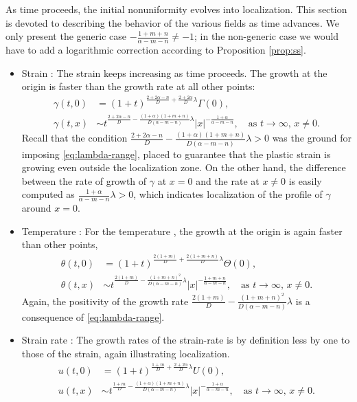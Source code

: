 \documentclass[11pt]{article}
\theoremstyle{remark}
\begin{document}
As time proceeds, the initial nonuniformity evolves into localization. This section is devoted to describing the behavior
of the various fields as time advances. We only present the generic case $-\frac{1+m+n}{\alpha-m-n}\ne-1$;
in the non-generic case we would have to add a logarithmic correction according to Proposition \ref{prop:ss}.
\begin{itemize}
 \item Strain : The strain keeps increasing as time proceeds. The growth at the origin is faster than the growth rate at  all other points:
\begin{align*}
 \gamma(t,0) &= (1+t)^{\frac{2+2\alpha-n}{D} + \frac{2+2\alpha}{D}\lambda}\Gamma(0),
 \\
 \gamma(t,x) &\sim t^{\frac{2+2\alpha-n}{D} - \frac{(1+\alpha)(1+m+n)}{D(\alpha-m-n)}\lambda}|x|^{-\frac{1+\alpha}{\alpha-m-n}}, \quad \text{as $t \rightarrow \infty$, $x\ne0$.}
\end{align*}
Recall that the condition  $\frac{2+2\alpha-n}{D} - \frac{(1+\alpha)(1+m+n)}{D(\alpha-m-n)}\lambda > 0$ was the ground for imposing \eqref{eq:lambda-range},
placed to guarantee that the plastic strain is growing even outside the localization zone. On the other hand, the difference between the rate of growth of $\gamma$ at $x=0$
and the rate at $x \ne 0$ is easily computed as $\frac{1+\alpha}{\alpha - m -n} \lambda > 0$, which indicates localization of the profile of $\gamma$ around $x=0$.
\item Temperature : For the  temperature , the growth at the origin is again faster than other points,
\begin{align*}
 \theta(t,0) &= (1+t)^{\frac{2(1+m)}{D} + \frac{2(1+m+n)}{D}\lambda}\Theta(0),
 \\
 \theta(t,x) &\sim t^{\frac{2(1+m)}{D} - \frac{(1+m+n)^2}{D(\alpha-m-n)}\lambda}|x|^{-\frac{1+m+n}{\alpha-m-n}}, \quad \text{as $t \rightarrow \infty$, $x\ne0$.}
\end{align*}
Again, the positivity of the growth rate $\frac{2(1+m)}{D} - \frac{(1+m+n)^2}{D(\alpha-m-n)}\lambda$ is a consequence of \eqref{eq:lambda-range}.
\item Strain rate : The growth rates of the strain-rate is by definition less by one to those of the strain, again illustrating localization.
\begin{align*}
 u(t,0) &= (1+t)^{\frac{1+m}{D} + \frac{2+2\alpha}{D}\lambda}U(0),
 \\
 u(t,x) &\sim t^{\frac{1+m}{D} - \frac{(1+\alpha)(1+m+n)}{D(\alpha-m-n)}\lambda}|x|^{-\frac{1+\alpha}{\alpha-m-n}}, \quad \text{as $t \rightarrow \infty$, $x\ne0$.}

\end{align*}
\end{itemize}
\end{document}
